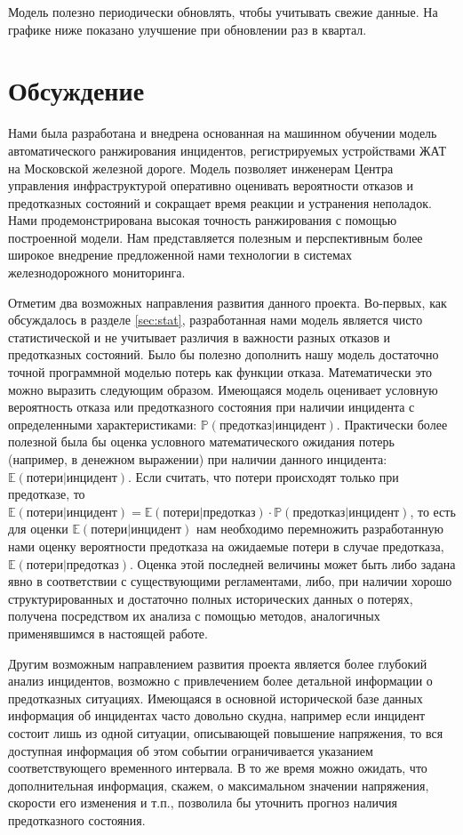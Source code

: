 Модель полезно периодически обновлять, чтобы учитывать свежие данные. На графике ниже показано улучшение при обновлении раз в квартал.



\section{Обсуждение}
Нами была разработана и внедрена основанная на машинном обучении модель автоматического ранжирования инцидентов, регистрируемых устройствами ЖАТ на Московской железной дороге. Модель позволяет инженерам Центра управления инфраструктурой оперативно оценивать вероятности отказов и предотказных состояний и сокращает время реакции и устранения неполадок. Нами продемонстрирована высокая точность ранжирования с помощью построенной модели. Нам представляется полезным и перспективным более широкое внедрение предложенной нами технологии в системах железнодорожного мониторинга.

Отметим два возможных направления развития данного проекта. Во-первых, как обсуждалось в разделе \ref{sec:stat}, разработанная нами модель является чисто статистической и не учитывает различия в важности разных отказов и предотказных состояний. Было бы полезно дополнить нашу модель достаточно точной программной моделью потерь как функции отказа. Математически это можно выразить следующим образом. Имеющаяся модель оценивает условную вероятность отказа или предотказного состояния при наличии инцидента с определенными характеристиками: $\mathbb P(\text{предотказ}|\text{инцидент})$. Практически более полезной была бы оценка условного математического ожидания потерь (например, в денежном выражении) при наличии данного инцидента: $\mathbb E(\text{потери}|\text{инцидент})$. Если считать, что потери происходят только при предотказе, то $\mathbb E(\text{потери}|\text{инцидент})=\mathbb E(\text{потери}|\text{предотказ})\cdot\mathbb P(\text{предотказ}|\text{инцидент})$, то есть для оценки $\mathbb E(\text{потери}|\text{инцидент})$ нам необходимо перемножить разработанную нами оценку вероятности предотказа на ожидаемые потери в случае предотказа, $\mathbb E(\text{потери}|\text{предотказ})$. Оценка этой последней величины может быть либо задана явно в соответствии с существующими регламентами, либо, при наличии хорошо структурированных и достаточно полных исторических данных о потерях, получена посредством их анализа с помощью методов, аналогичных применявшимся в настоящей работе.

Другим возможным направлением развития проекта является более глубокий анализ инцидентов, возможно с привлечением более детальной информации о предотказных ситуациях. Имеющаяся в основной исторической базе данных информация об инцидентах часто довольно скудна, например если инцидент состоит лишь из одной ситуации, описывающей повышение напряжения, то вся доступная информация об этом событии ограничивается указанием соответствующего временного интервала. В то же время можно ожидать, что дополнительная информация, скажем, о максимальном значении напряжения, скорости его изменения и т.п., позволила бы уточнить прогноз наличия предотказного состояния.


